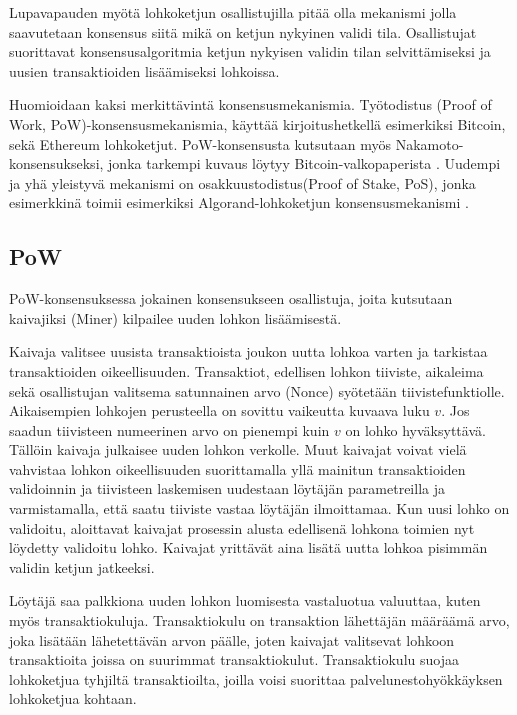  Lupavapauden myötä lohkoketjun osallistujilla pitää olla mekanismi jolla saavutetaan konsensus siitä mikä on ketjun nykyinen validi tila. Osallistujat suorittavat konsensusalgoritmia ketjun nykyisen validin tilan selvittämiseksi ja uusien transaktioiden lisäämiseksi lohkoissa. 

Huomioidaan kaksi merkittävintä konsensusmekanismia. Työtodistus (Proof of Work, PoW)-konsensusmekanismia, käyttää kirjoitushetkellä esimerkiksi Bitcoin, sekä Ethereum lohkoketjut. PoW-konsensusta kutsutaan myös Nakamoto-konsensukseksi, jonka tarkempi kuvaus löytyy Bitcoin-valkopaperista \cite{Nakamoto_bitcoin}. Uudempi ja yhä yleistyvä mekanismi on  osakkuustodistus(Proof of Stake, PoS), jonka esimerkkinä toimii esimerkiksi Algorand-lohkoketjun konsensusmekanismi \cite{gilad_algorand_2017}. 

\subsection{PoW}
PoW-konsensuksessa jokainen konsensukseen osallistuja, joita kutsutaan kaivajiksi (Miner) kilpailee uuden lohkon lisäämisestä.

Kaivaja valitsee uusista transaktioista joukon uutta lohkoa varten ja tarkistaa transaktioiden oikeellisuuden. Transaktiot, edellisen lohkon tiiviste, aikaleima sekä osallistujan valitsema satunnainen arvo (Nonce) syötetään tiivistefunktiolle. Aikaisempien lohkojen perusteella on sovittu vaikeutta kuvaava luku $v$. Jos saadun tiivisteen numeerinen arvo on pienempi kuin $v$ on lohko hyväksyttävä. Tällöin kaivaja julkaisee uuden lohkon verkolle. Muut kaivajat voivat vielä vahvistaa lohkon oikeellisuuden suorittamalla yllä mainitun transaktioiden validoinnin ja tiivisteen laskemisen uudestaan löytäjän parametreilla ja varmistamalla, että saatu tiiviste vastaa löytäjän ilmoittamaa. Kun uusi lohko on validoitu, aloittavat kaivajat prosessin alusta edellisenä lohkona toimien nyt löydetty validoitu lohko. Kaivajat yrittävät aina lisätä uutta lohkoa pisimmän validin ketjun jatkeeksi. 

Löytäjä saa palkkiona uuden lohkon luomisesta vastaluotua valuuttaa, kuten myös transaktiokuluja. Transaktiokulu on transaktion lähettäjän määräämä arvo, joka lisätään lähetettävän arvon päälle, joten kaivajat valitsevat lohkoon transaktioita joissa on suurimmat transaktiokulut. Transaktiokulu suojaa lohkoketjua tyhjiltä transaktioilta, joilla voisi suorittaa palvelunestohyökkäyksen lohkoketjua kohtaan.

